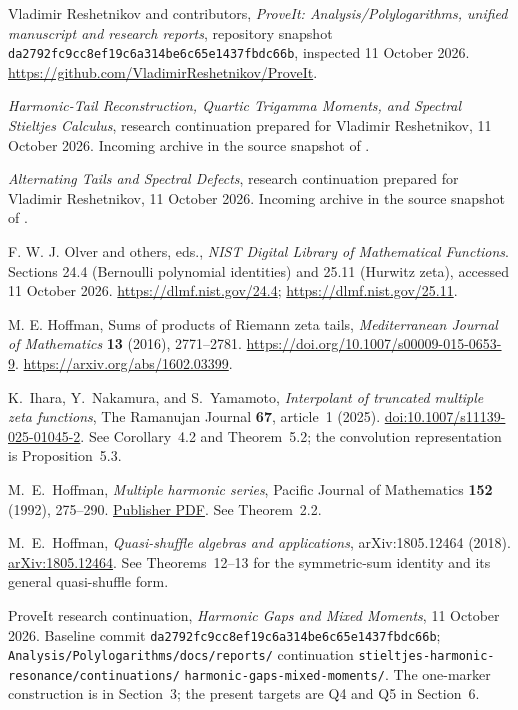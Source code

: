 Vladimir Reshetnikov and contributors,
\emph{ProveIt: Analysis/Polylogarithms, unified manuscript and research reports},
repository snapshot \texttt{da2792fc9cc8ef19c6a314be6c65e1437fbdc66b},
inspected 11 October 2026.
\url{https://github.com/VladimirReshetnikov/ProveIt}.

\emph{Harmonic-Tail Reconstruction, Quartic Trigamma Moments,
and Spectral Stieltjes Calculus},
research continuation prepared for Vladimir Reshetnikov, 11 October 2026.
Incoming archive 
in the source snapshot of \cite{RepoMain}.

\emph{Alternating Tails and Spectral Defects},
research continuation prepared for Vladimir Reshetnikov, 11 October 2026.
Incoming archive 
in the source snapshot of \cite{RepoMain}.

F. W. J. Olver and others, eds.,
\emph{NIST Digital Library of Mathematical Functions}.
Sections 24.4 (Bernoulli polynomial identities) and 25.11 (Hurwitz zeta),
accessed 11 October 2026.
\url{https://dlmf.nist.gov/24.4}; \url{https://dlmf.nist.gov/25.11}.

M. E. Hoffman,
Sums of products of Riemann zeta tails,
\emph{Mediterranean Journal of Mathematics} \textbf{13} (2016), 2771--2781.
\url{https://doi.org/10.1007/s00009-015-0653-9}.
\url{https://arxiv.org/abs/1602.03399}.

K.~Ihara, Y.~Nakamura, and S.~Yamamoto,
\emph{Interpolant of truncated multiple zeta functions},
The Ramanujan Journal \textbf{67}, article~1 (2025).
\href{https://doi.org/10.1007/s11139-025-01045-2}{doi:10.1007/s11139-025-01045-2}.
See Corollary~4.2 and Theorem~5.2; the convolution representation is
Proposition~5.3.


M.~E.~Hoffman, \emph{Multiple harmonic series},
Pacific Journal of Mathematics \textbf{152} (1992), 275--290.
\href{https://msp.org/pjm/1992/152-2/pjm-v152-n2-p04-s.pdf}{Publisher PDF}.
See Theorem~2.2.


M.~E.~Hoffman, \emph{Quasi-shuffle algebras and applications},
arXiv:1805.12464 (2018).
\href{https://arxiv.org/abs/1805.12464}{arXiv:1805.12464}.
See Theorems~12--13 for the symmetric-sum identity and its general
quasi-shuffle form.


ProveIt research continuation,
\emph{Harmonic Gaps and Mixed Moments}, 11 October 2026.
Baseline commit \texttt{da2792fc9cc8ef19c6a314be6c65e1437fbdc66b};
\texttt{Analysis/Polylogarithms/docs/reports/} continuation
\texttt{stieltjes-harmonic-resonance/continuations/}
\texttt{harmonic-gaps-mixed-moments/}.
The one-marker construction is in Section~3; the present targets are
Q4 and Q5 in Section~6.

